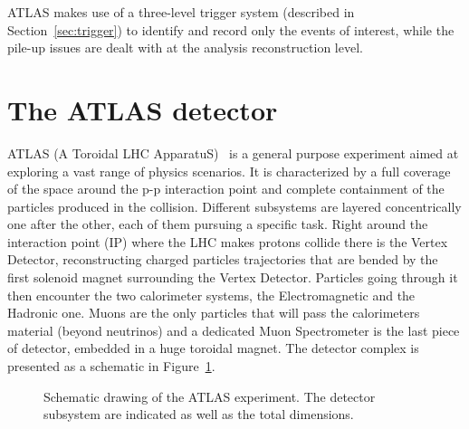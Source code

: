 ATLAS makes use of a three-level trigger system (described in Section~\ref{sec:trigger}) to identify
and record only the events of interest, while the pile-up issues are dealt with at the analysis 
reconstruction level.



\section{The ATLAS detector}\label{sec:atlas}

ATLAS (A Toroidal LHC ApparatuS)~\cite{Aad:2008zzm} is a general purpose experiment
aimed at exploring a vast range of physics scenarios. It is characterized by
a full coverage of the space around the p-p interaction point and complete
containment of the particles produced in the collision. Different subsystems are
layered concentrically one after the other, each of them pursuing a specific task. 
Right around the interaction point
(IP) where the LHC makes protons collide there is the Vertex Detector, reconstructing
charged particles trajectories that are bended by the first solenoid magnet surrounding
the Vertex Detector. Particles going through it then encounter the two calorimeter systems,
the Electromagnetic and the Hadronic one. Muons are the only particles that will pass
the calorimeters material (beyond neutrinos) and a dedicated Muon Spectrometer is the last
piece of detector, embedded in a huge toroidal magnet. The detector complex is presented
as a schematic in Figure~\ref{fig:atlas}. 

\begin{figure}[tb]\begin{center}
	\caption{Schematic drawing of the ATLAS experiment. The detector subsystem are indicated as well as the total dimensions.\label{fig:atlas}}
\end{center}\end{figure}

